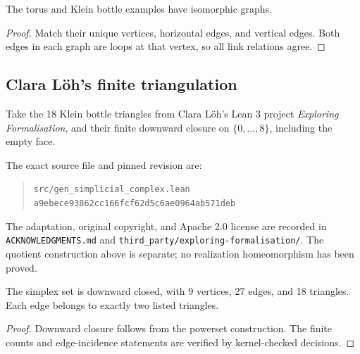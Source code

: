\begin{proposition}\label{prop:torus-klein-graph}

  The torus and Klein bottle examples have isomorphic graphs.
\end{proposition}
\begin{proof}

  Match their unique vertices, horizontal edges, and vertical edges. Both
  edges in each graph are loops at that vertex, so all link relations agree.
\end{proof}

\subsection{Clara L\"oh's finite triangulation}

\begin{definition}\label{def:klein-triangulation}

  Take the 18 Klein bottle triangles from Clara L\"oh's Lean 3 project
  \emph{Exploring Formalisation}, and their finite downward closure on
  $\{0,\ldots,8\}$, including the empty face.
\end{definition}
The exact source file and pinned revision are:
\begin{quote}\small
\texttt{src/gen\_simplicial\_complex.lean}\\
\texttt{a9ebece93862cc166fcf62d5c6ae0964ab571deb}
\end{quote}
The adaptation, original copyright, and Apache 2.0 license are recorded in
\texttt{ACKNOWLEDGMENTS.md} and \texttt{third\_party/exploring-formalisation/}.
The quotient construction above is separate; no realization homeomorphism
has been proved.

\begin{lemma}\label{lem:klein-triangulation-counts}

  The simplex set is downward closed, with 9 vertices, 27 edges, and 18
  triangles. Each edge belongs to exactly two listed triangles.
\end{lemma}
\begin{proof}

  Downward closure follows from the powerset construction. The finite counts
  and edge-incidence statements are verified by kernel-checked decisions.
\end{proof}
